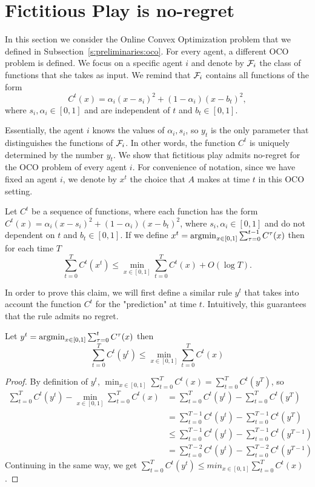 \section{Fictitious Play is no-regret}\label{s:fictitious_noregret}

In this section we consider the Online Convex Optimization problem
that we defined in Subsection~\ref{s:preliminaries:oco}. 
For every agent, a different OCO problem is defined.
We focus on a specific agent $i$ and denote by $\mathcal{F}_i$ the class of functions
that she takes as input. 
We remind that $\mathcal{F}_i$ contains all functions of the form
\[
  C^t(x) = \alpha_i(x-s_i)^2 + (1-\alpha_i)(x-b_t)^2,
\]
where $s_i,\alpha_i \in [0,1]$ and are independent of $t$ and $b_t \in [0,1]$.
 
Essentially, the agent $i$ knows the values of $\alpha_i , s_i$, so $y_t$ is the only
parameter that distinguishes the functions of $\mathcal{F}_i$.
In other words, the function $C^t$ is uniquely determined by the number $y_t$.
We show that fictitious play admits no-regret for the OCO problem of every agent $i$.
For convenience of notation, since we have fixed an agent $i$, we denote by
$x^t$ the choice that $A$ makes at time $t$ in this OCO setting. 
\begin{theorem}\label{t:no_regret}
  Let $C^t$ be a sequence of functions, where each function has the form
  $C^t(x) = \alpha_i(x-s_i)^2 + (1-\alpha_i)(x-b_t)^2$,
  where $s_i,\alpha_i \in [0,1]$ and do not dependent on $t$
  and $b_t \in [0,1]$.
  If we define \(x^t = \operatorname*{argmin}_{x \in [0,1]} \sum_{\tau = 0}^{t-1} C^\tau (x) \)
  then for each time $T$
  \[
    \sum_{t = 0}^{T} C^t(x^t) \leq
    \min_{x \in [0,1]} \sum_{t=0}^T C^t(x) + O(\log  T).
  \]
\end{theorem}

In order to prove this claim, we will first define a similar rule $y^t$
that takes into account the function $C^t$ for the "prediction" at time $t$.
Intuitively, this guarantees that the rule admits no regret.

\begin{lemma}
  Let
  \(y^t = \operatorname*{argmin}_{x \in [0,1]} \sum_{\tau = 0}^t C^\tau (x)\)
  then
  \[
    \sum_{t=0}^T C^t(y^t) \leq \min_{x \in [0,1]} \sum_{t=0}^T C^t(x)
  \]
\end{lemma}

\begin{proof}By definition of $y^t$,
  $\min_{x \in [0,1]} \sum_{t=0}^T C^t(x) = \sum_{t=0}^T C^t(y^T)$, so
  \begin{align*}
    \sum_{t=0}^T C^t(y^t) - \min_{x \in [0,1]} \sum_{t=0}^T C^t(x) &=
    \sum_{t=0}^T C^t(y^t) - \sum_{t=0}^T C^t(y^T)\\
    &= \sum_{t=0}^{T-1} C^t(y^t) - \sum_{t=0}^{T-1} C^t(y^T)\\
    &\leq \sum_{t=0}^{T-1} C^t(y^t) - \sum_{t=0}^{T-1} C^t(y^{T-1})\\
    &= \sum_{t=0}^{T-2} C^t(y^t) - \sum_{t=0}^{T-2} C^t(y^{T-1})
  \end{align*}
  Continuing in the same way, we get
  $\sum_{t=0}^T C^t(y^t) \leq min_{x \in [0,1]} \sum_{t=0}^T C^t(x)$.
\end{proof}

